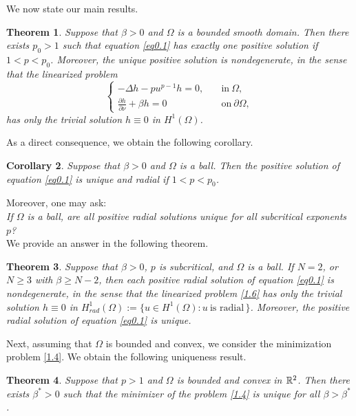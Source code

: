 \documentclass[12pt,reqno]{amsart}
\numberwithin{equation}{section}
\newtheorem{theorem}{Theorem}[section]
\newtheorem{corollary}[theorem]{Corollary}
\theoremstyle{definition}
\def\R{{\mathfrak R}}
\def\R{\Bbb R}
\begin{document}
We now state our main results.

\begin{theorem}\label{theorem1.1}
Suppose that $\beta>0$ and $\Omega$ is a bounded smooth domain. Then there exists $p_0>1$ such that equation \eqref{eq0.1} has exactly one positive solution if $1<p<p_0$. Moreover, the unique positive solution is nondegenerate, in the sense that the linearized problem 
\begin{equation}\label{1.6}
\begin{cases}
-\Delta h-pu^{p-1}h=0, \quad &\text{in}\ \Omega,\\
\frac{\partial h}{\partial \nu}+\beta h=0 &\text{on}\ \partial\Omega,
\end{cases}
\end{equation}
has only the trivial solution $h\equiv 0$ in $H^1(\Omega)$.
\end{theorem}


As a direct consequence, we obtain the following corollary.
\begin{corollary}\label{corollary1.2}
Suppose that $\beta>0$ and $\Omega$ is a ball. Then the positive solution of equation \eqref{eq0.1} is unique and radial if $1<p<p_0$.
\end{corollary}

Moreover, one may ask:\\
{\em If $\Omega$ is a ball, are all positive radial solutions unique for all subcritical exponents $p$?}\\
We provide an answer in the following theorem. 

\begin{theorem}\label{theorem1.3}
Suppose that $\beta>0$, $p$ is subcritical, and $\Omega$ is a ball. If $N=2$, or $N\ge3$ with $\beta\ge N-2$, then each positive radial solution of equation \eqref{eq0.1} is nondegenerate, in the sense that the linearized problem \eqref{1.6} has only the trivial solution $h\equiv0$ in $H^1_{rad}(\Omega):=\{u\in H^1(\Omega) : u\ \text{is radial}\,\}$. Moreover, the positive radial solution of equation \eqref{eq0.1} is unique.
\end{theorem}


Next, assuming that $\Omega$ is bounded and convex, we consider the minimization  problem \eqref{1.4}. We obtain the following uniqueness result.
\begin{theorem}\label{Th1-4}
 Suppose that $p>1$ and $\Omega$ is bounded and convex in $\R^2$. Then there exists $\beta^*>0$ such that the minimizer of the problem \eqref{1.4} is unique for all $\beta>\beta^*$.
\end{theorem}
\end{document}
